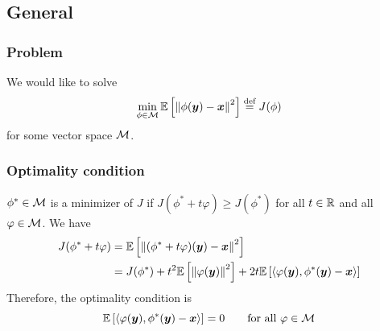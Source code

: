 \documentclass[a4paper,10pt]{article}
\begin{document}
\subsection{General}
\subsubsection{Problem}
We would like to solve
\begin{equation}\label{eq:general_problem}
    \min_{\phi \in \mathcal{M}} \mathbb{E} \left[ {\left\| \phi(\boldsymbol{y}) - \boldsymbol{x} \right \|^2} \right] \overset{\text{\scriptsize{def}}}{=} J(\phi)
\end{equation}
for some vector space $\mathcal{M}$. 
\subsubsection{Optimality condition}
$\phi^* \in \mathcal{M}$ is a minimizer of $J$ if $J(\phi^* + t \varphi) \geqslant J(\phi^*)$ for all $t \in \mathbb{R}$ and all $\varphi \in \mathcal{M}$. We have 
\begin{align*}
    J(\phi^* + t \varphi) &= \mathbb{E} \left[ {\left\| (\phi^* + t \varphi) (\boldsymbol{y}) - \boldsymbol{x} \right \|^2} \right] \\
    &= J(\phi^*) + t^2 \mathbb{E} \left[ {\left\| \varphi(\boldsymbol{y}) \right \|^2} \right] + 2t \mathbb{E} \left[ {\left\langle \varphi(\boldsymbol{y}), \phi^*(\boldsymbol{y}) - \boldsymbol{x} \right\rangle} \right] 
\end{align*}
Therefore, the optimality condition is 
\begin{equation}\label{eq:optimality_condition}
    \mathbb{E} \left[ {\left\langle \varphi(\boldsymbol{y}), \phi^*(\boldsymbol{y}) - \boldsymbol{x} \right\rangle} \right] = 0 \qquad \mbox{for all } \varphi \in \mathcal{M}
\end{equation}


\end{document}
